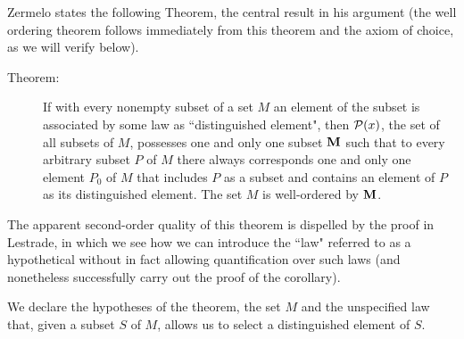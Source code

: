 \documentclass[12pt]{article}
\begin{document}
Zermelo states the following Theorem, the central result in his argument (the well ordering theorem follows immediately from this theorem and the axiom of choice, as we will verify below).

\begin{description}

\item[Theorem:]  If with every nonempty subset of a set $M$ an element of the subset is associated by some law as ``distinguished element", then ${\cal P}(x)$, the set of all subsets of $M$, possesses one and only one subset ${\bf M}$ such that to every arbitrary subset $P$ of $M$  there always corresponds one and only one element $P_0$ of $M$ that includes $P$ as a subset and contains an element of $P$ as its distinguished element.  The set $M$ is well-ordered by ${\bf M}$.

\end{description}

The apparent second-order quality of this theorem is dispelled by the proof in Lestrade, in which we see how we can introduce the ``law" referred to as a hypothetical without in fact allowing quantification over such laws (and nonetheless successfully carry out the proof of the corollary).



We declare the hypotheses of the theorem, the set $M$ and the unspecified law that, given a subset $S$ of $M$, allows us to select a distinguished element of $S$.
\end{document}
